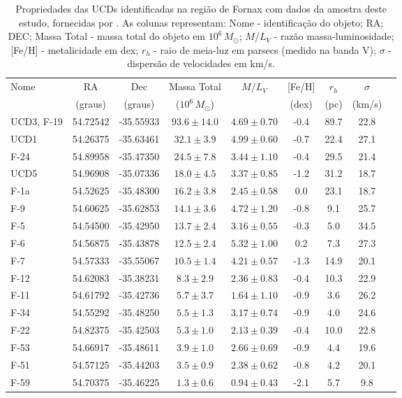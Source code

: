 \begin{table}[!ht]
    \centering
    \caption{Propriedades das UCDs identificadas na região de Fornax com dados da amostra deste estudo, fornecidas por \cite{Mieske_2008_2}. As colunas representam: Nome - identificação do objeto; \ac{RA}; \ac{DEC}; Massa Total - massa total do objeto em $10^6 \, M_\odot$; $M/L_V$ - razão massa-luminosidade; [Fe/H] - metalicidade em dex; $r_h$ - raio de meia-luz em parsecs (medido na banda V); $\sigma$ - dispersão de velocidades em km/s.}
    \begin{tabular}{lcccccccc}
        \toprule
        Nome & RA & Dec & Massa Total & $M/L_V$ & [Fe/H] & $r_h$ & $\sigma$ \\
        & (graus) & (graus) & ($10^6 \, M_\odot$) & & (dex) & (pc) & (km/s)\\
        \midrule
        UCD3, F-19 & 54.72542 & -35.55933 & $93.6 \pm 14.0$ & $4.69 \pm 0.70$ & -0.4 & 89.7 & 22.8 \\
        UCD1       & 54.26375 & -35.63461 & $32.1 \pm 3.9$  & $4.99 \pm 0.60$ & -0.7 & 22.4 & 27.1 \\
        F-24       & 54.89958 & -35.47350 & $24.5 \pm 7.8$  & $3.44 \pm 1.10$ & -0.4 & 29.5 & 21.4 \\
        UCD5       & 54.96908 & -35.07336 & $18.0 \pm 4.5$  & $3.37 \pm 0.85$ & -1.2 & 31.2 & 18.7 \\
        F-1a       & 54.52625 & -35.48300 & $16.2 \pm 3.8$  & $2.45 \pm 0.58$ & 0.0  & 23.1 & 18.7 \\
        F-9        & 54.60625 & -35.62853 & $14.1 \pm 3.6$  & $4.72 \pm 1.20$ & -0.8 & 9.1  & 25.7 \\
        F-5        & 54.54500 & -35.42950 & $13.7 \pm 2.4$  & $3.16 \pm 0.55$ & -0.3 & 5.0  & 34.5 \\
        F-6        & 54.56875 & -35.43878 & $12.5 \pm 2.4$  & $5.32 \pm 1.00$ & 0.2  & 7.3  & 27.3 \\
        F-7        & 54.57333 & -35.55067 & $10.5 \pm 1.4$  & $4.21 \pm 0.57$ & -1.3 & 14.9 & 20.1 \\
        F-12       & 54.62083 & -35.38231 & $8.3 \pm 2.9$   & $2.36 \pm 0.83$ & -0.4 & 10.3 & 22.9 \\
        F-11       & 54.61792 & -35.42736 & $5.7 \pm 3.7$   & $1.64 \pm 1.10$ & -0.9 & 3.6  & 26.2 \\
        F-34       & 54.55292 & -35.48250 & $5.5 \pm 1.3$   & $3.17 \pm 0.74$ & -0.9 & 4.0  & 24.6 \\
        F-22       & 54.82375 & -35.42503 & $5.3 \pm 1.0$   & $2.13 \pm 0.39$ & -0.4 & 10.0 & 22.8 \\
        F-53       & 54.66917 & -35.48611 & $3.9 \pm 1.0$   & $2.66 \pm 0.69$ & -0.9 & 4.4  & 19.6 \\
        F-51       & 54.57125 & -35.44203 & $3.5 \pm 0.9$   & $2.38 \pm 0.62$ & -0.8 & 4.2  & 20.1 \\
        F-59       & 54.70375 & -35.46225 & $1.3 \pm 0.6$   & $0.94 \pm 0.43$ & -2.1 & 5.7  & 9.8  \\
        \bottomrule
    \end{tabular}
    \label{ucds_fornax_propriedades}
\end{table}

